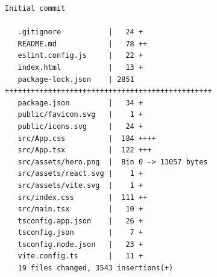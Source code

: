 \documentclass[12pt]{article}
\begin{document}
\begin{lstlisting}[numbers=none,breaklines=true]
      Initial commit

   .gitignore           |   24 +
   README.md            |   78 ++
   eslint.config.js     |   22 +
   index.html           |   13 +
   package-lock.json    | 2851 ++++++++++++++++++++++++++++++++++++++++++++++++
   package.json         |   34 +
   public/favicon.svg   |    1 +
   public/icons.svg     |   24 +
   src/App.css          |  184 ++++
   src/App.tsx          |  122 +++
   src/assets/hero.png  |  Bin 0 -> 13057 bytes
   src/assets/react.svg |    1 +
   src/assets/vite.svg  |    1 +
   src/index.css        |  111 ++
   src/main.tsx         |   10 +
   tsconfig.app.json    |   26 +
   tsconfig.json        |    7 +
   tsconfig.node.json   |   23 +
   vite.config.ts       |   11 +
   19 files changed, 3543 insertions(+)
\end{lstlisting}
\end{document}
